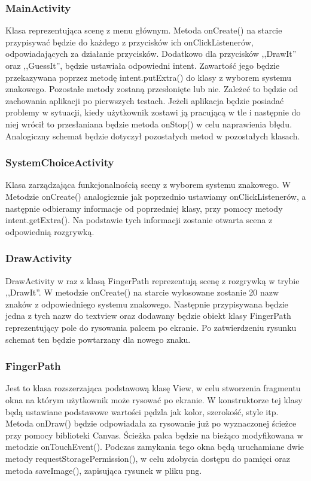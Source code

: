 \documentclass[15pt]{article}
\begin{document}
  \newpage
  \subsubsection{MainActivity}
  Klasa reprezentująca scenę z menu głównym. Metoda onCreate() na starcie przypisywać będzie do każdego z przycisków ich onClickListenerów, odpowiadających za działanie przycisków. Dodatkowo dla przycisków ,,DrawIt'' oraz ,,GuessIt'', będzie ustawiała odpowiedni intent. Zawartość jego będzie przekazywana poprzez metodę intent.putExtra() do klasy z wyborem systemu znakowego. Pozostałe metody zostaną przesłonięte lub nie. Zależeć to będzie od zachowania aplikacji po pierwszych testach. Jeżeli aplikacja będzie posiadać problemy w sytuacji, kiedy użytkownik zostawi ją pracującą w tle i następnie do niej wrócił to przesłaniana będzie metoda onStop() w celu naprawienia błędu. Analogiczny schemat będzie dotyczył pozostałych metod w pozostałych klasach. 
  \subsubsection{SystemChoiceActivity}
  Klasa zarządzająca funkcjonalnością sceny z wyborem systemu znakowego. W Metodzie onCreate()  analogicznie jak poprzednio ustawiamy onClickListenerów, a następnie odbieramy informacje od poprzedniej klasy, przy pomocy metody intent.getExtra(). Na podstawie tych informacji zostanie otwarta scena z odpowiednią rozgrywką. 
  
  \subsubsection{DrawActivity}
  DrawActivity w raz z klasą FingerPath reprezentują scenę z rozgrywką w trybie ,,DrawIt''. W metodzie onCreate() na starcie wylosowane zostanie 20 nazw znaków z odpowiedniego systemu znakowego. Następnie przypisywana będzie jedna z tych nazw do textview oraz dodawany będzie obiekt klasy FingerPath reprezentujący pole do rysowania palcem po ekranie. Po zatwierdzeniu rysunku schemat ten będzie powtarzany dla nowego znaku.
  
  \subsubsection{FingerPath}
  Jest to klasa rozszerzająca podstawową klasę View, w celu stworzenia fragmentu okna na którym użytkownik może rysować po ekranie. W konstruktorze tej klasy będą ustawiane podstawowe wartości pędzla jak kolor, szerokość, style itp. Metoda onDraw() będzie odpowiadała za rysowanie już po wyznaczonej ścieżce przy pomocy biblioteki Canvas. Ścieżka palca będzie na bieżąco modyfikowana w metodzie onTouchEvent(). Podczas zamykania tego okna będą uruchamiane dwie metody requestStoragePermission(), w celu zdobycia dostępu do pamięci oraz metoda saveImage(), zapisująca rysunek w pliku png.
  
\end{document}
